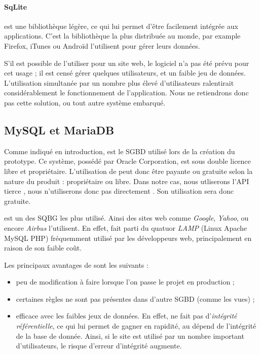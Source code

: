 \paragraph*{SqLite} est une bibliothèque légère, ce qui lui permet d'être facilement intégrée aux applications. C'est la bibliothèque la plus distribuée au monde, par example Firefox, iTunes ou Androïd l'utilisent pour gérer leurs données. 


S'il est possible de l'utiliser pour un site web, le logiciel n'a pas été prévu pour cet usage ; il est censé gérer quelques utilisateurs, et un faible jeu  de données. L'utilisation simultanée par un nombre plus élevé d'utilisateurs ralentirait considérablement le fonctionnement de l'application. Nous ne retiendrons donc pas cette solution, ou  tout autre système embarqué. 

\subsection{MySQL et MariaDB}
 
 Comme indiqué en introduction, \mysql est le SGBD utilisé lors de la création du prototype. Ce système, possédé par Oracle Corporation, est sous double licence libre et propriétaire. L'utilisation de \mysql peut donc être payante ou gratuite selon la nature du produit : propriétaire ou libre. Dans notre cas, nous utliserons l'API tierce \symfony, nous n'utiliserons donc pas directement \mysql. Son utilisation sera donc gratuite. 
 
 \mysql est un des SQBG les plus utilisé. Ainsi des sites web comme \textit{Google}, \textit{Yahoo}, ou encore \textit{Airbus}	l'utilisent. En effet, \mysql fait parti du quatuor \textit{LAMP} (Linux Apache MySQL PHP) fréquemment utilisé par les développeurs web, principalement en raison de son faible coût. 
 
 \smallbreak
 
 Les principaux avantages de \mysql sont les suivants : 
 \begin{itemize}
 \item peu de modification à faire lorsque l'on passe le projet en production  ;
 \item certaines règles ne sont pas présentes dans d'autre SGBD (comme les vues) ;
 \item efficace avec les faibles jeux de données. En effet, \mysql ne fait pas d'\textit{intégrité référentielle}, ce qui lui permet de gagner en rapidité, au dépend de l'intégrité de la base de donnée. Ainsi, si le site est utilisé par un nombre important d'utilisateurs, le risque d'erreur d'intégrité augmente. 
 \end{itemize}

